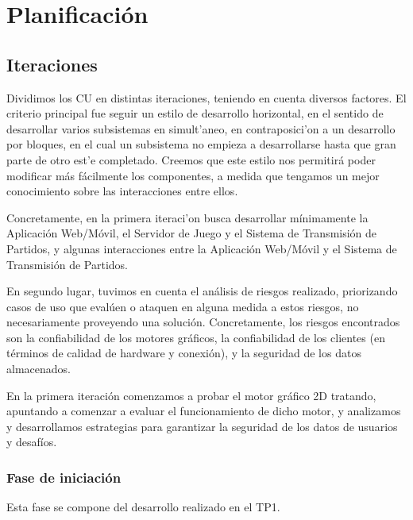 \documentclass[a4paper, 10pt, twoside]{article}
\begin{document}
\newpage


\section{Planificación}

\subsection{Iteraciones}
Dividimos los CU en distintas iteraciones, teniendo en cuenta diversos factores. El criterio principal fue seguir un estilo de desarrollo horizontal, en el sentido de desarrollar varios subsistemas en simult'aneo, en contraposici'on a un desarrollo por bloques, en el cual un subsistema no empieza a desarrollarse hasta que gran parte de otro est'e completado. Creemos que este estilo nos permitirá poder modificar más fácilmente los componentes, a medida que tengamos un mejor conocimiento sobre las interacciones entre ellos.

Concretamente, en la primera iteraci'on busca desarrollar mínimamente la Aplicación Web/Móvil, el Servidor de Juego y el Sistema de Transmisión de Partidos, y algunas interacciones entre la Aplicación Web/Móvil y el Sistema de Transmisión de Partidos.

En segundo lugar, tuvimos en cuenta el análisis de riesgos realizado, priorizando casos de uso que evalúen o ataquen en alguna medida a estos riesgos, no necesariamente proveyendo una solución. Concretamente, los riesgos encontrados son la confiabilidad de los motores gráficos, la confiabilidad de los clientes (en términos de calidad de hardware y conexión), y la seguridad de los datos almacenados.

En la primera iteración comenzamos a probar el motor gráfico 2D tratando, apuntando a comenzar a evaluar el funcionamiento de dicho motor, y analizamos y desarrollamos estrategias para garantizar la seguridad de los datos de usuarios y desafíos.

\subsubsection{Fase de iniciación}
Esta fase se compone del desarrollo realizado en el TP1.
\end{document}
